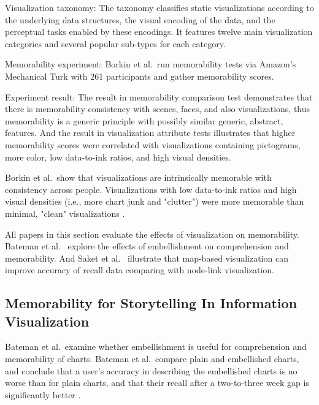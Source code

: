 \documentclass{egpubl}
\begin{document}
Visualization taxonomy: The taxonomy classifies static visualizations according to the underlying data structures, the visual encoding of the data, and the perceptual tasks enabled by these encodings. It features twelve main visualization categories and several popular sub-types for each category.

Memorability experiment: Borkin et al.\ run memorability tests via Amazon's Mechanical Turk with 261 participants and gather memorability scores.

Experiment result: The result in memorability comparison test demonstrates that there is memorability consistency with scenes, faces, and also visualizations, thus memorability is a generic principle with possibly similar generic, abstract, features. And the result in visualization attribute tests illustrates that higher memorability scores were correlated with visualizations containing pictograms, more color, low data-to-ink ratios, and high visual densities.

Borkin et al.\ show that visualizations are intrinsically memorable with consistency across people. Visualizations with low data-to-ink ratios and high visual densities (i.e., more chart junk and "clutter") were more memorable than minimal, "clean" visualizations \cite{borkin2013makes}. 



All papers in this section evaluate the effects of visualization on memorability. Bateman et al.\ \cite{bateman} explore the effects of embellishment on comprehension and memorability. And Saket et al.\ \cite{saket2015} illustrate that map-based visualization can improve accuracy of recall data comparing with node-link visualization.


\subsection{Memorability for Storytelling In Information Visualization}
Bateman et al.\ examine whether embellishment is useful for comprehension and memorability of charts. Bateman et al.\ compare plain and embellished charts, and conclude that a user's accuracy in describing the embellished charts is no worse than for plain charts, and that their recall after a two-to-three week gap is significantly better \cite{bateman}. 
\end{document}
